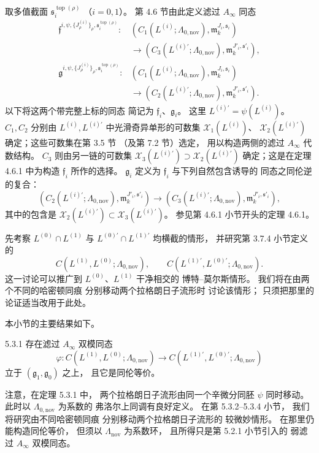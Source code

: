 取多值截面
$\mathfrak s_i^{\operatorname{top}(\rho)}$
（$i=0,1$）。
第 4.6 节由此定义滤过
$A_\infty$ 同态
\[
\begin{aligned}
\mathfrak f^{i,\psi,\{J^{(i)}_\rho\}_\rho,
  \mathfrak s_i^{\operatorname{top}(\rho)}}:
&(C_1(L^{(i)};\Lambda_{0,\mathrm{nov}}),
  \mathfrak m_k^{J_i,\mathfrak s_i})
\\
&\longrightarrow
(C_3(L^{(i)\prime};\Lambda_{0,\mathrm{nov}}),
  \mathfrak m_k^{J'_i,\mathfrak s'_i}),
\\[1mm]
\mathfrak g^{i,\psi,\{J^{(i)}_\rho\}_\rho,
  \mathfrak s_i^{\operatorname{top}(\rho)}}:
&(C_1(L^{(i)};\Lambda_{0,\mathrm{nov}}),
  \mathfrak m_k^{J_i,\mathfrak s_i})
\\
&\longrightarrow
(C_2(L^{(i)\prime};\Lambda_{0,\mathrm{nov}}),
  \mathfrak m_k^{J'_i,\mathfrak s'_i}).
\end{aligned}
\]
以下将这两个带完整上标的同态
简记为 $\mathfrak f_i$、$\mathfrak g_i$。
这里 $L^{(i)\prime}=\psi(L^{(i)})$。
$C_1,C_2$ 分别由
$L^{(i)},L^{(i)\prime}$
中光滑奇异单形的可数集
$\mathcal X_1(L^{(i)})$、
$\mathcal X_2(L^{(i)\prime})$
确定；这些可数集在第 3.5 节
（及第 7.2 节）选定，
用以构造两侧的滤过 $A_\infty$ 代数结构。
$C_3$ 则由另一链的可数集
$\mathcal X_3(L^{(i)\prime})
 \supset\mathcal X_2(L^{(i)\prime})$
确定；这是在定理 4.6.1 中为构造
$\mathfrak f_i$ 所作的选择。
$\mathfrak g_i$ 定义为
$\mathfrak f_i$ 与下列自然包含诱导的
同态之同伦逆的复合：
\[
(C_2(L^{(i)\prime};\Lambda_{0,\mathrm{nov}}),
 \mathfrak m_k^{J'_i,\mathfrak s'_i})
\longrightarrow
(C_3(L^{(i)\prime};\Lambda_{0,\mathrm{nov}}),
 \mathfrak m_k^{J'_i,\mathfrak s'_i}),
\]
其中的包含是
$\mathcal X_2(L^{(i)\prime})
\subset\mathcal X_3(L^{(i)\prime})$。
参见第 4.6.1 小节开头的定理 4.6.1。

先考察 $L^{(0)}\cap L^{(1)}$ 与
$L^{(0)\prime}\cap L^{(1)\prime}$
均横截的情形，
并研究第 3.7.4 小节定义的
\[
C(L^{(1)},L^{(0)};\Lambda_{0,\mathrm{nov}}),
\qquad
C(L^{(1)\prime},L^{(0)\prime};
  \Lambda_{0,\mathrm{nov}}).
\]
这一讨论可以推广到
$L^{(0)}$、$L^{(1)}$ 干净相交的
博特--莫尔斯情形。
我们将在由两个不同的哈密顿同痕
分别移动两个拉格朗日子流形时
讨论该情形；
只须把那里的论证适当改用于此处。

本小节的主要结果如下。
\begin{theorem}{5.3.1}\label{thm:5-3-1}
存在滤过 $A_\infty$ 双模同态
\[
\varphi\colon
C(L^{(1)},L^{(0)};\Lambda_{0,\mathrm{nov}})
\longrightarrow
C(L^{(1)\prime},L^{(0)\prime};
 \Lambda_{0,\mathrm{nov}})
\]
立于 $(\mathfrak g_1,\mathfrak g_0)$ 之上，
且它是同伦等价。
\end{theorem}
注意，在定理 5.3.1 中，
两个拉格朗日子流形由同一个辛微分同胚
$\psi$ 同时移动。
此时以 $\Lambda_{0,\mathrm{nov}}$ 为系数的
弗洛尔上同调有良好定义。
在第 5.3.2--5.3.4 小节，
我们将研究由不同哈密顿同痕
分别移动两个拉格朗日子流形的
较微妙情形。
在那里仍能构造同伦等价，
但须以 $\Lambda_{\mathrm{nov}}$ 为系数环，
且所得只是第 5.2.1 小节引入的
弱滤过 $A_\infty$ 双模同态。

